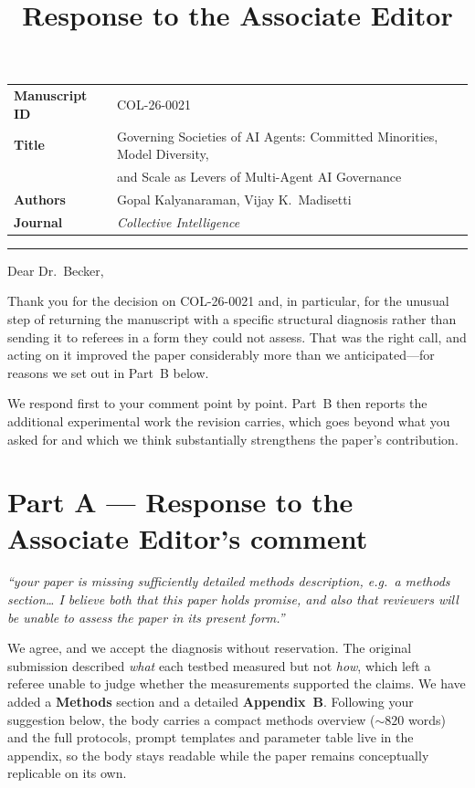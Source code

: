 \documentclass[11pt,a4paper]{article}
\title{\vspace{-2.2em}\textbf{Response to the Associate Editor}}
\date{}
\author{}
\newenvironment{editorquote}
  {\par\medskip\noindent\begin{list}{}{%
     \setlength{\leftmargin}{2em}\setlength{\rightmargin}{1em}}\item[]%
     \color{black!72}\itshape}
  {\end{list}\medskip}
\begin{document}
\maketitle
\vspace{-3.5em}

\noindent
\begin{tabular}{@{}ll@{}}
\textbf{Manuscript ID} & COL-26-0021 \\
\textbf{Title} & Governing Societies of AI Agents: Committed Minorities, Model
                 Diversity, \\ & and Scale as Levers of Multi-Agent AI Governance \\
\textbf{Authors} & Gopal Kalyanaraman, Vijay K.\ Madisetti \\
\textbf{Journal} & \emph{Collective Intelligence} \\
\end{tabular}

\bigskip\hrule\bigskip

Dear Dr.\ Becker,

Thank you for the decision on COL-26-0021 and, in particular, for the unusual step
of returning the manuscript with a specific structural diagnosis rather than
sending it to referees in a form they could not assess. That was the right call,
and acting on it improved the paper considerably more than we anticipated---for
reasons we set out in Part~B below.

We respond first to your comment point by point. Part~B then reports the additional
experimental work the revision carries, which goes beyond what you asked for and
which we think substantially strengthens the paper's contribution.

\section*{Part A --- Response to the Associate Editor's comment}

\begin{editorquote}
``your paper is missing sufficiently detailed methods description, e.g.\ a methods
section\ldots{} I believe both that this paper holds promise, and also that
reviewers will be unable to assess the paper in its present form.''
\end{editorquote}

We agree, and we accept the diagnosis without reservation. The original submission
described \emph{what} each testbed measured but not \emph{how}, which left a referee
unable to judge whether the measurements supported the claims. We have added a
\textbf{Methods} section and a detailed \textbf{Appendix~B}. Following your
suggestion below, the body carries a compact methods overview (${\sim}820$ words)
and the full protocols, prompt templates and parameter table live in the appendix,
so the body stays readable while the paper remains conceptually replicable on its
own.
\end{document}
